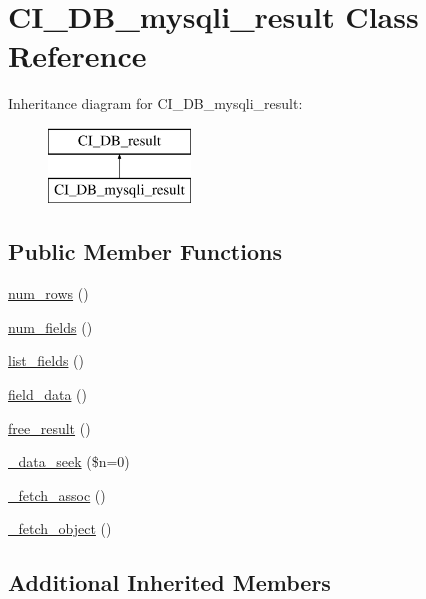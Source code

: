 \hypertarget{class_c_i___d_b__mysqli__result}{\section{C\-I\-\_\-\-D\-B\-\_\-mysqli\-\_\-result Class Reference}
\label{class_c_i___d_b__mysqli__result}
}
Inheritance diagram for C\-I\-\_\-\-D\-B\-\_\-mysqli\-\_\-result\-:\begin{figure}[H]
\begin{center}
\leavevmode
\includegraphics[height=2.000000cm]{class_c_i___d_b__mysqli__result}
\end{center}
\end{figure}
\subsection*{Public Member Functions}
\begin{DoxyCompactItemize}
\item 
\hyperlink{class_c_i___d_b__mysqli__result_a218657c303ee499b97710ab0cd2f5d6e}{num\-\_\-rows} ()
\item 
\hyperlink{class_c_i___d_b__mysqli__result_af831bf363e4d7d661a717a4932af449d}{num\-\_\-fields} ()
\item 
\hyperlink{class_c_i___d_b__mysqli__result_a50b54eb4ea7cfd039740f532988ea776}{list\-\_\-fields} ()
\item 
\hyperlink{class_c_i___d_b__mysqli__result_a84bffd65e53902ade1591716749a33e3}{field\-\_\-data} ()
\item 
\hyperlink{class_c_i___d_b__mysqli__result_aad2d98d6beb3d6095405356c6107b473}{free\-\_\-result} ()
\item 
\hyperlink{class_c_i___d_b__mysqli__result_aeba9dd69307793342d1c81ccb3e55ff9}{\-\_\-data\-\_\-seek} (\$n=0)
\item 
\hyperlink{class_c_i___d_b__mysqli__result_a43a9a92817f1334a1c10752ec44275a0}{\-\_\-fetch\-\_\-assoc} ()
\item 
\hyperlink{class_c_i___d_b__mysqli__result_a236bae79bb43606aa86598719b281c1f}{\-\_\-fetch\-\_\-object} ()
\end{DoxyCompactItemize}
\subsection*{Additional Inherited Members}



